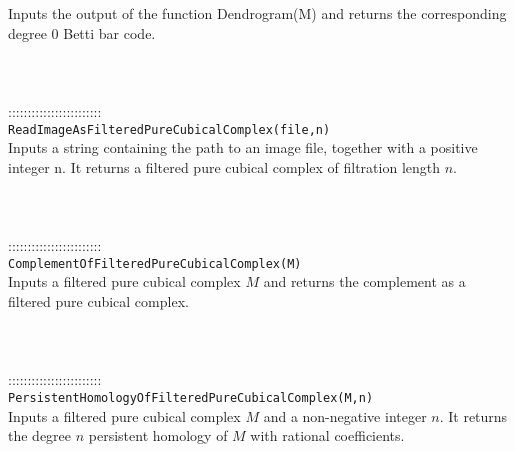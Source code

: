 \documentclass[a4paper,11pt]{report}
\begin{document}
{ Inputs the output of the function Dendrogram(M) and returns the corresponding
degree 0 Betti bar code. \\
 \\
 \\
 \\
 ::::::::::::::::::::::::\\
 \texttt{ReadImageAsFilteredPureCubicalComplex(file,n)}\\
 

 Inputs a string containing the path to an image file, together with a positive
integer n. It returns a filtered pure cubical complex of filtration length $n$. \\
 \\
 \\
 \\
 ::::::::::::::::::::::::\\
 \texttt{ComplementOfFilteredPureCubicalComplex(M)}\\
 

 Inputs a filtered pure cubical complex $M$ and returns the complement as a filtered pure cubical complex. \\
 \\
 \\
 \\
 ::::::::::::::::::::::::\\
 \texttt{PersistentHomologyOfFilteredPureCubicalComplex(M,n)}\\
 

 Inputs a filtered pure cubical complex $M$ and a non-negative integer $n$. It returns the degree $n$ persistent homology of $ M$ with rational coefficients. \\
 \\
 \\
 }

 
\end{document}
